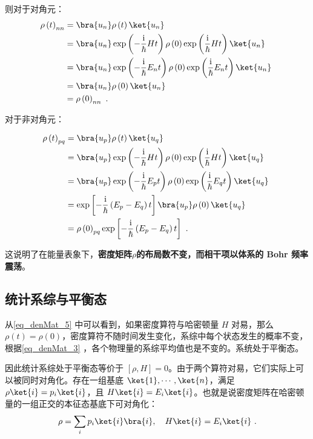 则对于对角元：
\begin{equation}
\begin{aligned}
\rho\left( t \right)_{nn} &= \bra{u_n}\rho\left( t \right)\ket{u_n}\\
&= \bra{u_n}\exp\left(-\frac{\mathrm{i}}{\hbar}H t\right)\rho\left( 0 \right)\exp\left(\frac{\mathrm{i}}{\hbar}H t\right)\ket{u_n} \\
&=\bra{u_n}\exp\left(-\frac{\mathrm{i}}{\hbar}E_n t\right)  \rho\left( 0 \right)  \exp\left(\frac{\mathrm{i}}{\hbar}E_n t\right)  \ket{u_n} \\
&=\bra{u_n}\rho\left( 0 \right)\ket{u_n} \\
&=\rho\left( 0 \right)_{nn}~.
\end{aligned}~
\end{equation}

对于非对角元：

\begin{equation}
\begin{aligned}
\rho \left( t \right)_{pq} &= \bra{u_p}\rho\left(t\right)\ket{u_q} \\
&= \bra{u_p}\exp\left(-\frac{\mathrm{i}}{\hbar}H t\right)\rho\left(0\right)\exp\left(\frac{\mathrm{i}}{\hbar}H t\right)\ket{u_q} \\
&= \bra{u_p}\exp\left(-\frac{\mathrm{i}}{\hbar}E_p t\right)\rho\left( 0 \right)\exp\left(\frac{\mathrm{i}}{\hbar}E_q t\right)\ket{u_q} \\
&=\exp\left[-\frac{\mathrm{i}}{\hbar}\left(E_p-E_q\right) t\right]\bra{u_p}\rho\left( 0 \right)\ket{u_q} \\
&= \rho \left( 0 \right)_{pq}\exp\left[-\frac{\mathrm{i}}{\hbar}\left(E_p-E_q\right) t\right]~.
\end{aligned}~
\end{equation}

这说明了在能量表象下，\textbf{密度矩阵$\rho$的布局数不变，而相干项以体系的 Bohr 频率震荡}。






\subsection{统计系综与平衡态}
从\autoref{eq_denMat_5} 中可以看到，如果密度算符与哈密顿量 $H$ 对易，那么 $\rho(t)=\rho(0)$，密度算符不随时间发生变化，系综中每个状态发生的概率不变，根据\autoref{eq_denMat_3} ，各个物理量的系综平均值也是不变的。系统处于平衡态。

因此统计系综处于平衡态等价于 $[\rho,H]=0$。由于两个算符对易，它们实际上可以被同时对角化。存在一组基底 $\ket{1},\cdots,\ket{n}$，满足 $\rho \ket{i} = p_i \ket{i}$，且 $H\ket{i}=E_i \ket{i}$。也就是说密度矩阵在哈密顿量的一组正交的本征态基底下可对角化：
\begin{equation}
\rho = \sum_i p_i \ket{i}\bra{i},\quad H\ket{i}=E_i \ket{i}~.
\end{equation}




